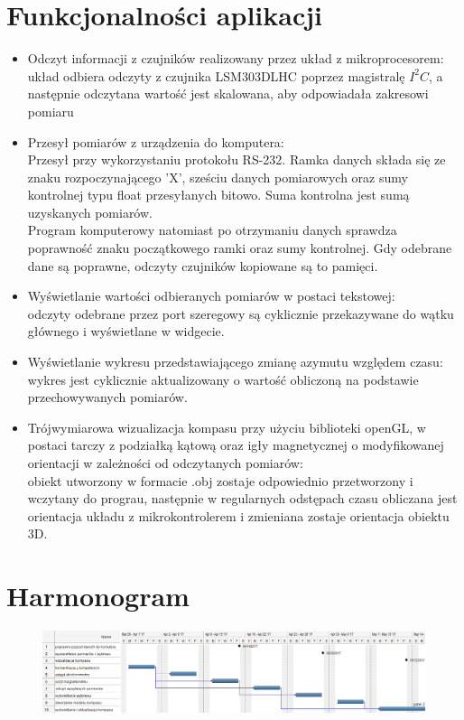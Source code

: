 \documentclass{article}
\begin{document}
\section{Funkcjonalności aplikacji}
\begin{itemize}
\item Odczyt informacji z czujników realizowany przez układ z mikroprocesorem:\\układ odbiera odczyty z czujnika LSM303DLHC poprzez magistralę $I^2C$, a następnie odczytana wartość jest skalowana, aby odpowiadała zakresowi pomiaru
\item Przesył pomiarów z urządzenia do komputera:\\Przesył przy wykorzystaniu protokołu RS-232. Ramka danych składa się ze znaku rozpoczynającego 'X', sześciu danych pomiarowych oraz sumy kontrolnej typu float przesyłanych bitowo. Suma kontrolna jest sumą uzyskanych pomiarów.\\Program komputerowy natomiast po otrzymaniu danych sprawdza poprawność znaku początkowego ramki oraz sumy kontrolnej. Gdy odebrane dane są poprawne, odczyty czujników kopiowane są to pamięci.
\item Wyświetlanie wartości odbieranych pomiarów w postaci tekstowej:\\odczyty odebrane przez port szeregowy są cyklicznie przekazywane do wątku głównego i wyświetlane w widgecie.
\item Wyświetlanie wykresu przedstawiającego zmianę azymutu względem czasu:\\wykres jest cyklicznie aktualizowany o wartość obliczoną na podstawie przechowywanych pomiarów.
\item Trójwymiarowa wizualizacja kompasu przy użyciu biblioteki openGL, w postaci tarczy z podziałką kątową oraz igły magnetycznej o modyfikowanej orientacji w zależności od odczytanych pomiarów:\\obiekt utworzony w formacie .obj zostaje odpowiednio przetworzony i wczytany do prograu, następnie w regularnych odstępach czasu obliczana jest orientacja układu z mikrokontrolerem i zmieniana zostaje orientacja obiektu 3D.
\end{itemize}

\section{Harmonogram}
\begin{figure}[H]
  \centering
  \includegraphics[width=\linewidth]{wds.png}
\end{figure}
\end{document}
